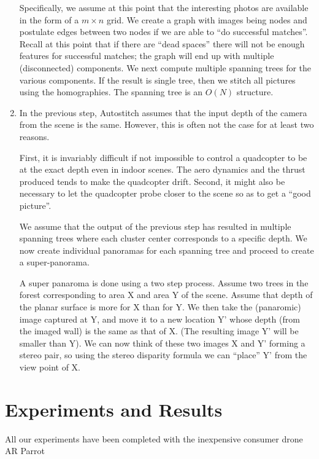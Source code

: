 \documentclass[10pt,twocolumn,letterpaper]{article}
\begin{document}
\begin{enumerate}
  Specifically, we assume at this point that the interesting photos
  are available in the form of a $m \times n$ grid. We create a graph
  with images being nodes and postulate edges between two nodes if we
  are able to ``do successful matches''. Recall at this point that if
  there are ``dead spaces'' there will not be enough features for
  successful matches; the graph will end up with multiple
  (disconnected) components.  We next compute multiple spanning trees
  for the various components. If the result is single tree, then we
  stitch all pictures using the homographies.  The spanning tree is an
  $O(N)$ structure. 


\item In the previous step, Autostitch assumes that the input depth of
  the camera from the scene is the same. However, this is often not
  the case for at least two reasons.

  First, it is invariably difficult if not impossible to control a
  quadcopter to be at the exact depth even in indoor scenes.  The aero
  dynamics and the thrust produced tends to make the quadcopter drift.
  Second, it might also be necessary to let the quadcopter probe
  closer to the scene so as to get a ``good picture''.

  We assume that the output of the previous step has resulted in
  multiple spanning trees where each cluster center corresponds to a
  specific depth. We now create individual panoramas for each spanning
  tree and proceed to create a super-panorama.  

  A super panaroma is done using a two step process. Assume two trees
  in the forest corresponding to area X and area Y of the
  scene. Assume that depth of the planar surface is more for X than
  for Y. We then take the (panaromic) image captured at Y, and move it
  to a new location Y’ whose depth (from the imaged wall) is the same
  as that of X. (The resulting image Y’ will be smaller than Y). We
  can now think of these two images X and Y’ forming a stereo pair, so
  using the stereo disparity formula we can ``place'' Y’ from the view
  point of X.

\end{enumerate}



\section{Experiments and Results}

All our experiments have been completed with the inexpensive consumer
drone AR Parrot
\end{document}
